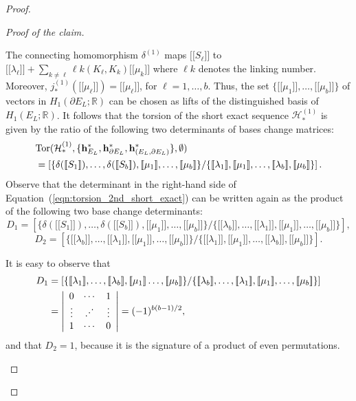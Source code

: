 \documentclass[a4paper]{amsart}
\theoremstyle{plain}
\theoremstyle{definition}
\theoremstyle{remark}
\newcommand{\IR}{{\mathbb R}}
\newcommand{\Tor}[3]{\mathrm{Tor} ({#1}, {#2}, {#3})}
\newcommand{\bbrack}[1]{\lbrack \! \lbrack #1 \rbrack \! \rbrack}
\newcommand{\hbasis}[2][h]{\mathbf{#1}^{#2}}
\newcommand{\hbasisrel}[1]{%
\hbasis{*}_{#1}, \hbasis{*}_{\bord #1}, \hbasis{*}_{(#1, \bord #1)}%
}
\newcommand{\lk}{\ell\mathit{k}}
\newcommand{\bord}{\partial}
\begin{document}
\begin{proof}
\begin{proof}[Proof of the claim]
\begin{itemize}
    The connecting homomorphism $\delta^{(1)}$ maps $\bbrack{S_\ell}$
    to $\bbrack{\lambda_\ell} + \sum_{k \ne \ell} \ell k(K_\ell,
    K_k)\bbrack{\mu_k}$ where $\lk$ denotes the linking number.
    Moreover, $j_*^{(1)}(\bbrack{\mu_\ell}) = \bbrack{\mu_\ell}$, for
    $\ell=1, \ldots, b$.  Thus, the set $\{\bbrack{\mu_1}, \ldots,
    \bbrack{\mu_b}\}$ of vectors in $H_1(\bord E_L; \IR)$ can be
    chosen as lifts of the distinguished basis of $H_1(E_L; \IR)$.  It
    follows that the torsion of the short exact sequence
    $\mathcal{H}_*^{(1)}$ is given by the ratio of the following two determinants of 
    bases change matrices:
      \begin{align}
        \lefteqn{
          \Tor{\mathcal{H}^{(1)}_*}{\{\hbasisrel{E_L}\}}{\emptyset}
        } & \nonumber \\
        &= 
          \left[ 
          \{ \delta(\bbrack{S_1}), \ldots, \delta(\bbrack{S_b}), 
             \bbrack{\mu_1}, \ldots, \bbrack{\mu_b} 
          \} / \{ 
              \bbrack{\lambda_1}, \bbrack{\mu_1}, 
              \ldots, 
              \bbrack{\lambda_b}, \bbrack{\mu_b}
          \}
          \right]. \label{eqn:torsion_2nd_short_exact}
      \end{align}
      Observe that the determinant in the right-hand side of
      Equation~(\ref{eqn:torsion_2nd_short_exact}) can be written again as
      the product of the following two base change determinants:
      $$
      D_1 = 
        \left[ 
        \{ 
          \delta(\bbrack{S_1}), \ldots, \delta(\bbrack{S_b}), 
          \bbrack{\mu_1}, \ldots, \bbrack{\mu_b}
        \} / \{
          \bbrack{\lambda_b}, \ldots, \bbrack{\lambda_1},
          \bbrack{\mu_1}, \ldots, \bbrack{\mu_b}
        \} 
        \right],
      $$
      $$ 
      D_2 = 
        \left[ 
        \{ 
           \bbrack{\lambda_b}, \ldots, \bbrack{\lambda_1}, 
           \bbrack{\mu_1}, \ldots, \bbrack{\mu_b}
        \} / \{ 
           \bbrack{\lambda_1}, \bbrack{\mu_1}, 
           \ldots, 
           \bbrack{\lambda_b}, \bbrack{\mu_b}
        \} 
        \right].
      $$

      It is easy to observe that
      \begin{align*}
        D_1 &= 
        \left[ 
          \{
            \bbrack{\lambda_1}, \ldots, \bbrack{\lambda_b}, 
            \bbrack{\mu_1} \ldots, \bbrack{\mu_b}
          \} / \{
            \bbrack{\lambda_b}, \ldots, \bbrack{\lambda_1}, 
            \bbrack{\mu_1}, \ldots, \bbrack{\mu_b}
          \}
         \right] \\
        & = \left|
          \begin{array}{ccc}
            0      & \cdots  & 1 \\
            \vdots & \rotatebox{45}{$\dots$} & \vdots \\
            1      & \cdots  & 0
          \end{array}
        \right| = (-1)^{b(b-1)/2},
      \end{align*}
      and that $D_2 = 1$, because it is the signature of a product of
      even permutations.


\end{itemize}
\end{proof}
\end{proof}
\end{document}
